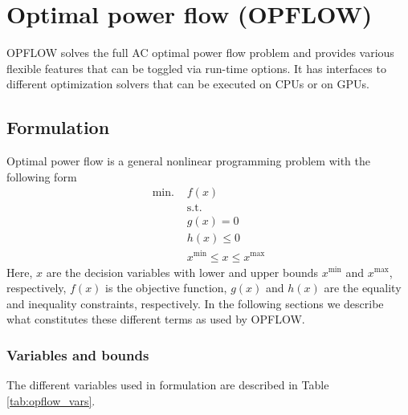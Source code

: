 \chapter{Optimal power flow (OPFLOW)}\label{chap:opflow}

OPFLOW solves the full AC optimal power flow problem and provides various flexible features that can be toggled via run-time options. It has interfaces to different optimization solvers that can be executed on CPUs or on GPUs.

\section{Formulation}
Optimal power flow is a general nonlinear programming problem with the following form
\begin{align}
\text{min. }& f(x) \\
&\text{s.t.} \nonumber \\
& g(x) = 0 \\
& h(x) \le 0 \\
& x^{\text{min}} \le x \le x^{\text{max}}
\end{align}
Here, $x$ are the decision variables with lower and upper bounds $x^{\text{min}}$ and $x^{\text{max}}$, respectively, $f(x)$ is the objective function, $g(x)$ and $h(x)$ are the equality and inequality constraints, respectively. In the following sections we describe what constitutes these different terms as used by OPFLOW.

\subsection{Variables and bounds} \label{subsec:opflow_var}

The different variables used in \opflow formulation are described in Table \ref{tab:opflow_vars}.

